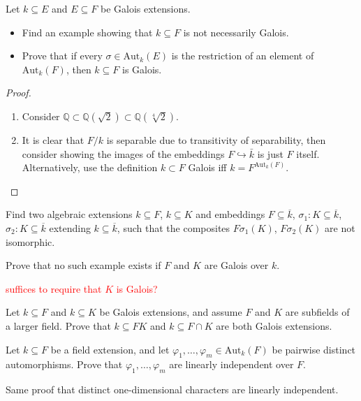 \documentclass[openany]{book}
\newcommand{\aut}{\text{Aut}}
\newcommand{\Q}{\mathbb{Q}}
\begin{document}
\begin{prob}
Let $k \subseteq E$ and $E \subseteq F$ be Galois extensions.
\begin{itemize}
    \item Find an example showing that $k \subseteq F$ is not necessarily Galois.
    \item Prove that if every $\sigma \in \text{Aut}_k(E)$ is the restriction of an element of $\text{Aut}_k(F)$, then $k \subseteq F$ is Galois.
\end{itemize}
\end{prob}
\begin{proof}
    \begin{enumerate}
        \item Consider $\Q\subset\Q(\sqrt{2})\subset\Q(\sqrt[4]{2})$.
        \item It is clear that $F/k$ is separable due to transitivity of separability, then consider showing the images of the embeddings $F\hookrightarrow \bar{k}$ is just $F$ itself. Alternatively, use the definition $k\subset F$ Galois iff $k=F^{\aut_k(F)}$.
    \end{enumerate}
\end{proof}




\begin{prob}
Find two algebraic extensions $k \subseteq F$, $k \subseteq K$ and embeddings $F \subseteq \overline{k}$, $\sigma_1 : K \subseteq \overline{k}$, $\sigma_2 : K \subseteq \overline{k}$ extending $k \subseteq \overline{k}$, such that the composites $F\sigma_1(K)$, $F\sigma_2(K)$ are not isomorphic.

Prove that no such example exists if $F$ and $K$ are Galois over $k$.
\end{prob}
\textcolor{red}{suffices to require that $K$ is Galois?}



\begin{prop}
Let $k \subseteq F$ and $k \subseteq K$ be Galois extensions, and assume $F$ and $K$ are subfields of a larger field. Prove that $k \subseteq FK$ and $k \subseteq F \cap K$ are both Galois extensions.
\end{prop}

\begin{prop}
Let $k \subseteq F$ be a field extension, and let $\varphi_1, \ldots, \varphi_m \in \text{Aut}_k(F)$ be pairwise distinct automorphisms. Prove that $\varphi_1, \ldots, \varphi_m$ are linearly independent over $F$.
\end{prop}
Same proof that distinct one-dimensional characters are linearly independent.
\end{document}

